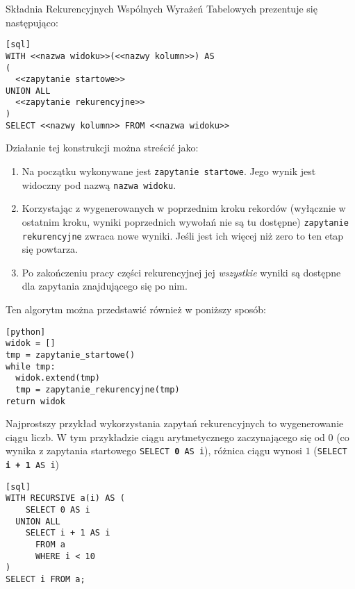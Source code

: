 Składnia Rekurencyjnych Wspólnych Wyrażeń Tabelowych prezentuje się następująco:




\begin{verbatim}[sql]
WITH <<nazwa widoku>>(<<nazwy kolumn>>) AS
(
  <<zapytanie startowe>>
UNION ALL
  <<zapytanie rekurencyjne>>
)
SELECT <<nazwy kolumn>> FROM <<nazwa widoku>>
\end{verbatim}

Działanie tej konstrukcji można streścić jako:
\begin{enumerate}
    \item
        Na początku wykonywane jest \texttt{zapytanie startowe}.
        Jego wynik jest widoczny pod nazwą \texttt{nazwa widoku}.
    \item
        Korzystając z wygenerowanych w poprzednim kroku rekordów
        (wyłącznie w ostatnim kroku, wyniki poprzednich wywołań nie są tu dostępne)
        \texttt{zapytanie rekurencyjne} zwraca nowe wyniki.
        Jeśli jest ich więcej niż zero to ten etap się powtarza.
    \item
        Po zakończeniu pracy części rekurencyjnej jej \emph{wszystkie} wyniki są dostępne dla zapytania znajdującego się po nim.
\end{enumerate}

Ten algorytm można przedstawić również w poniższy sposób:
\begin{verbatim}[python]
widok = []
tmp = zapytanie_startowe()
while tmp:
  widok.extend(tmp)
  tmp = zapytanie_rekurencyjne(tmp)
return widok
\end{verbatim}

Najprostszy przykład wykorzystania zapytań rekurencyjnych to wygenerowanie ciągu liczb. 
W tym przykładzie ciągu arytmetycznego zaczynającego się od $0$ (co wynika z zapytania startowego \texttt{SELECT \textbf{0} AS i}), 
różnica ciągu wynosi $1$ (\texttt{SELECT \textbf{i + 1} AS i})

\begin{verbatim}[sql]
WITH RECURSIVE a(i) AS (
    SELECT 0 AS i
  UNION ALL
    SELECT i + 1 AS i
      FROM a
      WHERE i < 10
)
SELECT i FROM a;
\end{verbatim}



